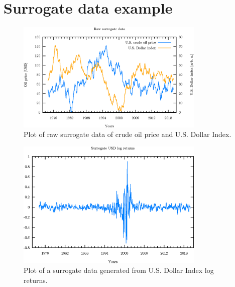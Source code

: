 \appendix
\newpage
\section{Surrogate data example} \label{appendix:surrogate-example}

\begin{figure}[h]
\begin{center}
\includegraphics[width=0.8\textwidth]{./code/plot/surrogate_raw.eps}
\caption{Plot of raw surrogate data of crude oil price and U.S. Dollar Index.}
\label{fig:s-raw}
\end{center}
\end{figure}

\begin{figure}[h]
\begin{center}
\includegraphics[width=0.8\textwidth]{./code/plot/surrogate_dollar_logret.eps}
\caption{Plot of a surrogate data generated from U.S. Dollar Index log returns.}
\label{fig:s-usd-logret}
\end{center}
\end{figure}

